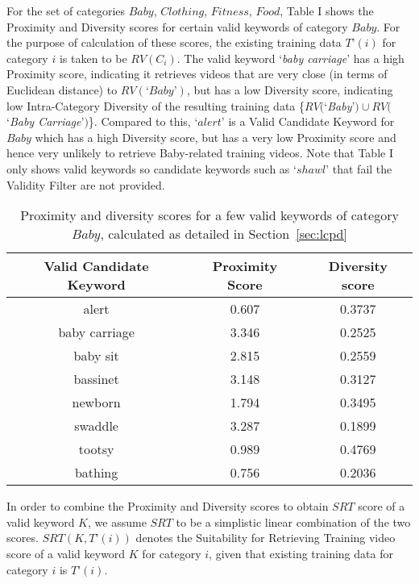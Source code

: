 For the set of categories {$Baby$, $Clothing$, $Fitness$, $Food$}, Table I shows the Proximity and Diversity scores for certain valid keywords of category $Baby$. For the purpose of calculation of these scores, the existing training data $T\text{'}(i)$ for category $i$ is taken to be $RV(C_i)$. The valid keyword `\textit{baby carriage}' has a high Proximity score, indicating it retrieves videos that are very close (in terms of Euclidean distance) to $RV(\text{`}Baby\text{'})$, but has a low Diversity score, indicating low Intra-Category Diversity of the resulting training data \{$RV($`\textit{Baby}'$) \cup RV($`\textit{Baby Carriage}'$)$\}. Compared to this, `$alert$' is a Valid Candidate Keyword for $Baby$ which has a high Diversity score, but has a very low Proximity score and hence very unlikely to retrieve Baby-related training videos.  Note that Table I only shows valid keywords so candidate keywords such as `$shawl$' that fail the Validity Filter are not provided.

\begin{table}
\fontsize{8pt}{1em}\selectfont
\begin{center}
\caption{{Proximity and diversity scores for a few valid keywords of category $Baby$, calculated as detailed in Section~\ref{sec:lcpd}}
\label{tab:PopularKeywords}}
\begin{tabular}{|c|c|c|}
		\hline
		\textbf{Valid Candidate Keyword} & \textbf{Proximity Score} & \textbf{Diversity score} \\
		\hline
		alert   & 0.607 & 0.3737\\
		\hline
		baby carriage & 3.346  & 0.2525\\
		\hline
		baby sit   & 2.815 & 0.2559\\
		\hline
		bassinet  & 3.148 & 0.3127\\
		\hline
		newborn  & 1.794 & 0.3495\\
		\hline
		swaddle  & 3.287 & 0.1899\\
		\hline
		tootsy  & 0.989 & 0.4769\\
		\hline
		bathing  & 0.756 & 0.2036\\
		\hline		
\end{tabular}
\vspace{-0.25in}
\end{center}
\end{table}

In order to combine the Proximity and Diversity scores to obtain $SRT$ score of a valid keyword $K$, we assume $SRT$ to be a simplistic linear combination of the two scores. $SRT(K, T\text{'}(i))$ denotes the Suitability for Retrieving Training video score of a valid keyword $K$  for category $i$, given that existing training data for category $i$ is $T\text{'}(i)$.  


